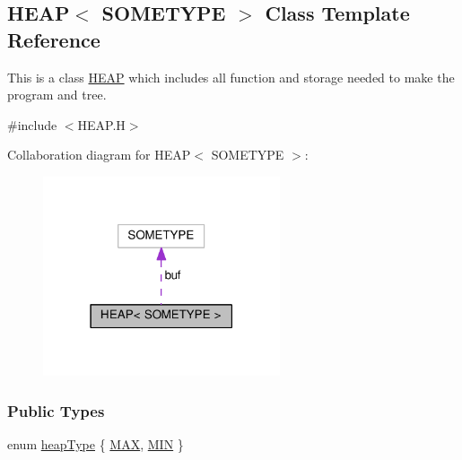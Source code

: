 \hypertarget{classHEAP}{\subsection{H\+E\+A\+P$<$ S\+O\+M\+E\+T\+Y\+P\+E $>$ Class Template Reference}
\label{classHEAP}
}


This is a class \hyperlink{classHEAP}{H\+E\+A\+P} which includes all function and storage needed to make the program and tree.  




{\ttfamily \#include $<$H\+E\+A\+P.\+H$>$}



Collaboration diagram for H\+E\+A\+P$<$ S\+O\+M\+E\+T\+Y\+P\+E $>$\+:\nopagebreak
\begin{figure}[H]
\begin{center}
\leavevmode
\includegraphics[width=198pt]{classHEAP__coll__graph}
\end{center}
\end{figure}
\subsubsection*{Public Types}
\begin{DoxyCompactItemize}
\item 
enum \hyperlink{classHEAP_a440ecc6b7771102dbaa63b3dacce6c27}{heap\+Type} \{ \hyperlink{classHEAP_a440ecc6b7771102dbaa63b3dacce6c27af40ccc5dc19d4acb72467707512926c6}{M\+A\+X}, 
\hyperlink{classHEAP_a440ecc6b7771102dbaa63b3dacce6c27a38253c74a285d04166dcc555cb4c8f19}{M\+I\+N}
 \}
\end{DoxyCompactItemize}
